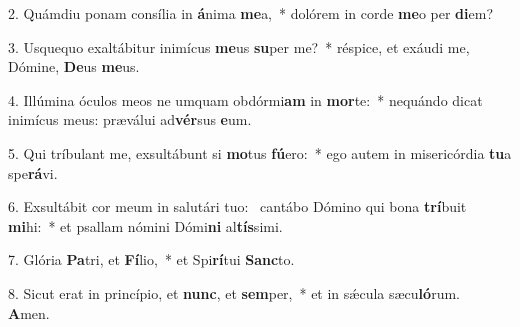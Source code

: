2. Quámdiu ponam consília in \textbf{á}nima \textbf{me}a,~*  dolórem in corde \textbf{me}o per \textbf{di}em?\

3. Usquequo exaltábitur inimícus \textbf{me}us \textbf{su}per me?~*  réspice, et exáudi me, Dómine, \textbf{De}us \textbf{me}us.\

4. Illúmina óculos meos ne umquam obdórmi\textbf{am} in \textbf{mor}te:~*  nequándo dicat inimícus meus: præválui ad\textbf{vér}sus \textbf{e}um.\

5. Qui tríbulant me, exsultábunt si \textbf{mo}tus \textbf{fú}ero:~*  ego autem in misericórdia \textbf{tu}a spe\textbf{rá}vi.\

6. Exsultábit cor meum in salutári tuo: \dag\  cantábo Dómino qui bona \textbf{trí}buit \textbf{mi}hi:~*  et psallam nómini Dómi\textbf{ni} al\textbf{tís}simi.\

7. Glória \textbf{Pa}tri, et \textbf{Fí}lio,~*  et Spi\textbf{rí}tui \textbf{Sanc}to.\

8. Sicut erat in princípio, et \textbf{nunc}, et \textbf{sem}per,~*  et in sǽcula sæcu\textbf{ló}rum. \textbf{A}men.\

